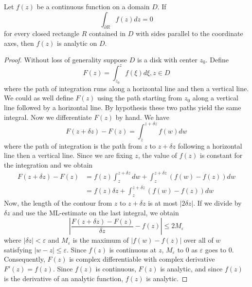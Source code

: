 \documentclass[12pt, a4paper, oneside, openright, titlepage]{book}
\begin{document}
\begin{namthm} \label{namthm:morera}
    Let $f(z)$ be a continuous function on a domain $D$. If \begin{equation*}
        \int_{\partial R}f(z)dz = 0
    \end{equation*}
    for every closed rectangle $R$ contained in $D$ with sides parallel to the coordinate axes, then $f(z)$ is analytic on $D$.
\end{namthm}
\begin{proof}
    Without loss of generality suppose $D$ is a disk with center $z_0$. Define \begin{equation*}
        F(z) = \int_{z_0}^zf(\xi)d\xi, z \in D
    \end{equation*}
    where the path of integration runs along a horizontal line and then a vertical line. We could as well define $F(z)$ using the path starting from $z_0$ along a vertical line followed by a horizontal line. By hypothesis these two paths yield the same integral. Now we differentiate $F(z)$ by hand. We have \begin{equation*}
        F(z+\delta z) - F(z) = \int_z^{z+\delta z}f(w)dw
    \end{equation*}
    where the path of integration is the path from $z$ to $z+\delta z$ following a horizontal line then a vertical line. Since we are fixing $z$, the value of $f(z)$ is constant for the integration and we obtain \begin{align*}
        F(z+\delta z)-F(z)&= f(z)\int_z^{z+\delta z}dw+\int_z^{z+\delta z}(f(w)-f(z))dw \\
        &= f(z)\delta z + \int_z^{z+\delta z}(f(w)-f(z))dw
    \end{align*}
    Now, the length of the contour from $z$ to $z+\delta z$ is at most $|2\delta z|$. If we divide by $\delta z$ and use the ML-estimate on the last integral, we obtain \begin{equation*}
        \left|\frac{F(z+\delta z)-F(z)}{\delta z} - f(z) \right| \leq 2M_{\varepsilon}
    \end{equation*}
    where $|\delta z| < \varepsilon$ and $M_{\varepsilon}$ is the maximum of $|f(w)-f(z)|$ over all of $w$ satisfying $|w-z| \leq \varepsilon$. Since $f(z)$ is continuous at $z$, $M_{\varepsilon}$ to $0$ as $\varepsilon$ goes to $0$. Consequently, $F(z)$ is complex differentiable with complex derivative $F'(z) = f(z)$. Since $f(z)$ is continuous, $F(z)$ is analytic, and since $f(z)$ is the derivative of an analytic function, $f(z)$ is analytic.
\end{proof}
\end{document}

